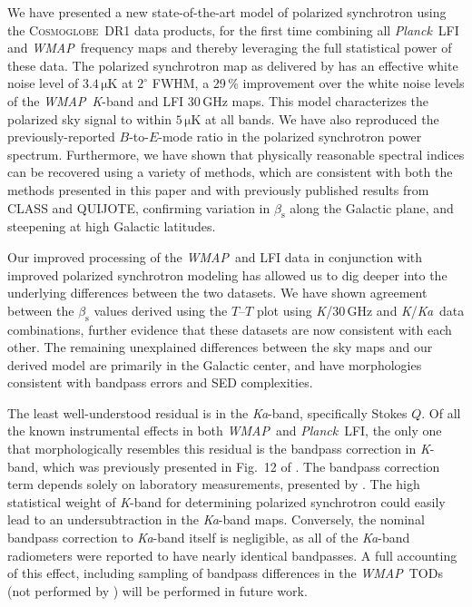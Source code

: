 \documentclass[twocolumn]{../../common/aa}
\def\WMAP{\emph{WMAP}}
\def\Planck{\emph{Planck}}
\newcommand{\cosmoglobe}{\textsc{Cosmoglobe}}
\newcommand{\K}[0]{\textit K}
\newcommand{\Ka}[0]{\textit{Ka}}
\begin{document}
We have presented a new state-of-the-art model of polarized synchrotron using the \cosmoglobe\ DR1 data products, for the first time combining all \Planck\ LFI and \WMAP\ frequency maps and thereby leveraging the full statistical power of these data. The polarized synchrotron map as delivered by \citet{watts2023_dr1} has an effective white noise level of $3.4\,\mathrm{\mu K}$ at $2^\circ$ FWHM, a 29\,\% improvement over the white noise levels of the \WMAP\ \K-band and LFI 30\,GHz maps. This model characterizes the polarized sky signal to within $5\,\mathrm{\mu K}$ at all bands. We have also reproduced the previously-reported $B$-to-$E$-mode ratio in the polarized synchrotron power spectrum. Furthermore, we have shown that physically reasonable spectral indices can be recovered using a variety of methods, which are consistent with both the methods presented in this paper and with previously published results from CLASS and QUIJOTE, confirming variation in $\beta_\mathrm s$ along the Galactic plane, and steepening at high Galactic latitudes.


Our improved processing of the \WMAP\ and LFI data in conjunction with improved polarized synchrotron modeling has allowed us to dig deeper into the underlying differences between the two datasets. We have shown agreement between the $\beta_\mathrm s$ values derived using the $T$--$T$ plot using \K/30\,GHz and \K/\Ka\ data combinations, further evidence that these datasets are now consistent with each other. The remaining unexplained differences between the sky maps and our derived model are primarily in the Galactic center, and have morphologies consistent with bandpass errors and SED complexities.


The least well-understood residual is in the \Ka-band, specifically Stokes $Q$. Of all the known instrumental effects in both \WMAP\ and \Planck\ LFI, the only one that morphologically resembles this residual is the bandpass correction in \K-band, which was previously presented in Fig.~12 of \citet{watts2023_dr1}. The bandpass correction term depends solely on laboratory measurements, presented by \citet{jarosik2003:MAP}. The high statistical weight of \K-band for determining polarized synchrotron could easily lead to an undersubtraction in the \Ka-band maps. Conversely, the nominal bandpass correction to \Ka-band itself is negligible, as all of the \Ka-band radiometers were reported to have nearly identical bandpasses. A full accounting of this effect, including sampling of bandpass differences in the \WMAP\ TODs (not performed by \citealt{watts2023_dr1}) will be performed in future work.
\end{document}
